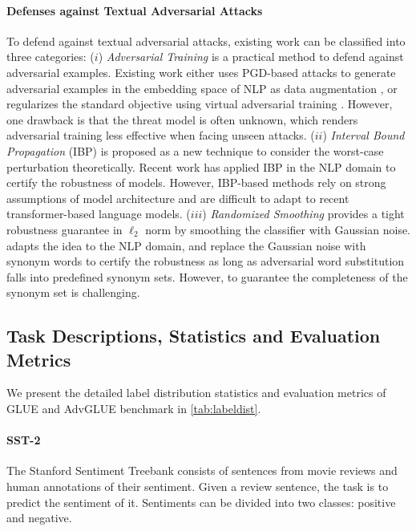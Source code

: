 \documentclass{article}
\newcommand{\method}{AdvGLUE\xspace}
\begin{document}
\paragraph{Defenses against Textual Adversarial Attacks} To defend against textual adversarial attacks, existing work can be classified into three categories:
($i$) \textit{Adversarial Training} is a practical method to defend against adversarial examples. Existing work either uses PGD-based attacks to generate adversarial examples in the embedding space of NLP as data augmentation \citep{freelb}, or regularizes the standard objective using virtual adversarial training \citep{smart,alum,gan2020large}. However, one drawback is that the threat model is often unknown, which renders adversarial training less effective when facing unseen attacks.
($ii$) \textit{Interval Bound Propagation} (IBP) \citep{ibp} is proposed as a new technique to consider the worst-case perturbation theoretically. Recent work \citep{ibp1,ibp2} has applied IBP in the NLP domain to certify the robustness of models. However, IBP-based methods rely on strong assumptions of model architecture and are difficult to adapt to recent transformer-based language models. 
($iii$) \textit{Randomized Smoothing} \citep{DBLP:conf/icml/CohenRK19} provides a tight robustness guarantee in $\ell_2$ norm by smoothing the classifier with Gaussian noise. \citet{safer} adapts the idea to the NLP domain, and replace the Gaussian noise with synonym words to certify the robustness as long as adversarial word substitution falls into predefined synonym sets. However, to guarantee the completeness of the synonym set is challenging.



\subsection{Task Descriptions, Statistics and Evaluation Metrics}
\label{appendix:tasks}


We present the detailed label distribution statistics and evaluation metrics of GLUE and \method benchmark in \ref{tab:labeldist}.

\paragraph{SST-2} The Stanford Sentiment Treebank \cite{socher2013recursive} consists of sentences from movie reviews and human annotations of their sentiment. Given a review sentence, the task is to predict the sentiment of it. Sentiments can be divided into two classes: positive and negative.
\end{document}
